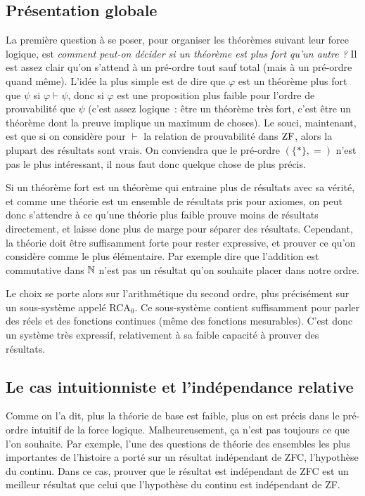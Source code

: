 \documentclass{article}
\begin{document}
\subsection{Présentation globale}

La première question à se poser, pour organiser les théorèmes suivant leur force logique, est \textit{comment peut-on décider si un théorème est plus fort qu'un autre ?} Il est assez clair qu'on s'attend à un pré-ordre tout sauf total (mais à un pré-ordre quand même). L'idée la plus simple est de dire que $\varphi$ est un théorème plus fort que $\psi$ si $\varphi \vdash \psi$, donc si $\varphi$ est une proposition plus faible pour l'ordre de prouvabilité que $\psi$ (c'est assez logique~: être un théorème très fort, c'est être un théorème dont la preuve implique un maximum de choses). Le souci, maintenant, est que si on considère pour $\vdash$ la relation de prouvabilité dans $\mathrm{ZF}$, alors la plupart des résultats sont vrais. On conviendra que le pré-ordre $(\{*\},=)$ n'est pas le plus intéressant, il nous faut donc quelque chose de plus précis.

Si un théorème fort est un théorème qui entraine plus de résultats avec sa vérité, et comme une théorie est un ensemble de résultats pris pour axiomes, on peut donc s'attendre à ce qu'une théorie plus faible prouve moins de résultats directement, et laisse donc plus de marge pour séparer des résultats. Cependant, la théorie doit être suffisamment forte pour rester expressive, et prouver ce qu'on considère comme le plus élémentaire. Par exemple dire que l'addition est commutative dans $\mathbb{N}$ n'est pas un résultat qu'on souhaite placer dans notre ordre.

Le choix se porte alors sur l'arithmétique du second ordre, plus précisément sur un sous-système appelé RCA$_0$. Ce sous-système contient suffisamment pour parler des réels et des fonctions continues (même des fonctions mesurables). C'est donc un système très expressif, relativement à sa faible capacité à prouver des résultats. 

\subsection{Le cas intuitionniste et l'indépendance relative}

Comme on l'a dit, plus la théorie de base est faible, plus on est précis dans le pré-ordre intuitif de la force logique. Malheureusement, ça n'est pas toujours ce que l'on souhaite. Par exemple, l'une des questions de théorie des ensembles les plus importantes de l'histoire a porté sur un résultat indépendant de ZFC, l'hypothèse du continu. Dans ce cas, prouver que le résultat est indépendant de ZFC est un meilleur résultat que celui que l'hypothèse du continu est indépendant de ZF.
\end{document}
